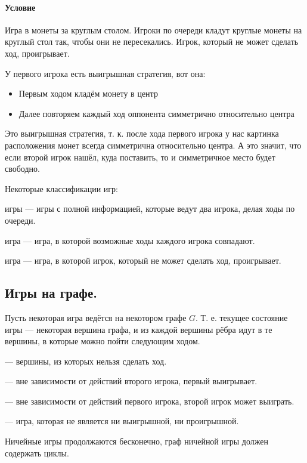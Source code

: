 \paragraph{Условие} Игра в монеты за круглым столом. Игроки по очереди кладут круглые монеты на круглый стол так, чтобы они не пересекались. Игрок, который не может сделать ход, проигрывает.

У первого игрока есть выигрышная стратегия, вот она:
\begin{itemize}
  \item Первым ходом кладём монету в центр
  \item Далее повторяем каждый ход оппонента симметрично относительно центра
\end{itemize}

Это выигрышная стратегия, т. к. после хода первого игрока у нас картинка расположения монет всегда 
симметрична относительно центра. А это значит, что если второй игрок нашёл, куда поставить, то и 
симметричное место будет свободно.

Некоторые классификации игр:
\begin{definition}
   игры --- игры с полной информацией, которые ведут два игрока, делая ходы 
  по очереди.
\end{definition}
\begin{definition}
   игра --- игра, в которой возможные ходы каждого игрока совпадают.
\end{definition}
\begin{definition}
   игра --- игра, в которой игрок, который не может сделать ход, проигрывает.
\end{definition}

\subsection{Игры на графе.}
Пусть некоторая игра ведётся на некотором графе $G$. Т. е. текущее состояние игры --- некоторая вершина
графа, и из каждой вершины рёбра идут в те вершины, в которые можно пойти следующим ходом.

\begin{definition}
   --- вершины, из которых нельзя сделать ход.
\end{definition}

\begin{definition}
   --- вне зависимости от действий второго игрока, первый выигрывает.
\end{definition}
\begin{definition}
   --- вне зависимости от действий первого игрока, второй игрок может
  выиграть.
\end{definition}
\begin{definition}
   --- игра, которая не является ни выигрышной, ни проигрышной.
\end{definition}
\begin{remark}
  Ничейные игры продолжаются бесконечно, граф ничейной игры должен содержать циклы.
\end{remark}

